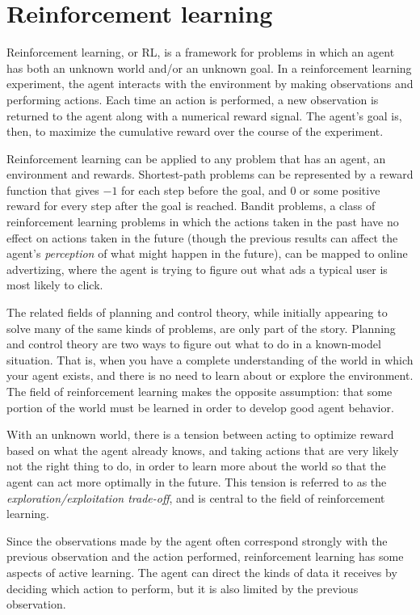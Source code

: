 \section{Reinforcement learning}

Reinforcement learning, or RL, is a framework for problems in which an agent has both an unknown world and/or an unknown goal. In a reinforcement learning experiment, the agent interacts with the environment by making observations and performing actions. Each time an action is performed, a new observation is returned to the agent along with a numerical reward signal. The agent's goal is, then, to maximize the cumulative reward over the course of the experiment.

Reinforcement learning can be applied to any problem that has an agent, an environment and rewards. Shortest-path problems can be represented by a reward function that gives $-1$ for each step before the goal, and $0$ or some positive reward for every step after the goal is reached. Bandit problems, a class of reinforcement learning problems in which the actions taken in the past have no effect on actions taken in the future (though the previous results can affect the agent's \emph{perception} of what might happen in the future), can be mapped to online advertizing, where the agent is trying to figure out what ads a typical user is most likely to click.

The related fields of planning and control theory, while initially appearing to solve many of the same kinds of problems, are only part of the story. Planning and control theory are two ways to figure out what to do in a known-model situation. That is, when you have a complete understanding of the world in which your agent exists, and there is no need to learn about or explore the environment. The field of reinforcement learning makes the opposite assumption: that some portion of the world must be learned in order to develop good agent behavior.

With an unknown world, there is a tension between acting to optimize reward based on what the agent already knows, and taking actions that are very likely not the right thing to do, in order to learn more about the world so that the agent can act more optimally in the future. This tension is referred to as the \emph{exploration/exploitation trade-off}, and is central to the field of reinforcement learning.

Since the observations made by the agent often correspond strongly with the previous observation and the action performed, reinforcement learning has some aspects of active learning. The agent can direct the kinds of data it receives by deciding which action to perform, but it is also limited by the previous observation.

